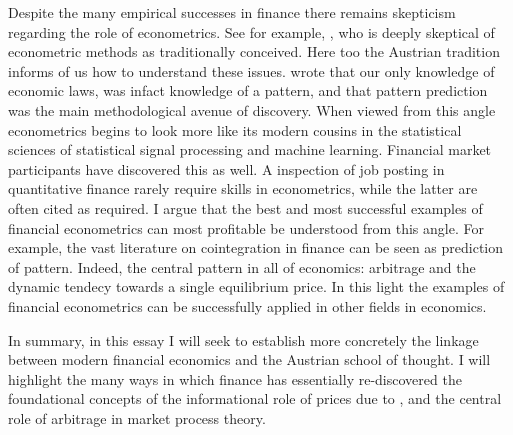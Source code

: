 \documentclass[11pt,]{article}
\begin{document}
Despite the many empirical successes in finance there remains skepticism
regarding the role of econometrics. See for example, \citet{Black1982},
who is deeply skeptical of econometric methods as traditionally
conceived. Here too the Austrian tradition informs of us how to
understand these issues. \citet{Hayek1994} wrote that our only knowledge
of economic laws, was infact knowledge of a pattern, and that pattern
prediction was the main methodological avenue of discovery. When viewed
from this angle econometrics begins to look more like its modern cousins
in the statistical sciences of statistical signal processing and machine
learning. Financial market participants have discovered this as well. A
inspection of job posting in quantitative finance rarely require skills
in econometrics, while the latter are often cited as required. I argue
that the best and most successful examples of financial econometrics can
most profitable be understood from this angle. For example, the vast
literature on cointegration in finance can be seen as prediction of
pattern. Indeed, the central pattern in all of economics: arbitrage and
the dynamic tendecy towards a single equilibrium price. In this light
the examples of financial econometrics can be successfully applied in
other fields in economics.

In summary, in this essay I will seek to establish more concretely the
linkage between modern financial economics and the Austrian school of
thought. I will highlight the many ways in which finance has essentially
re-discovered the foundational concepts of the informational role of
prices due to \citet{Hayek1945}, and the central role of arbitrage in
market process theory.

\newpage
\singlespacing 

\end{document}
